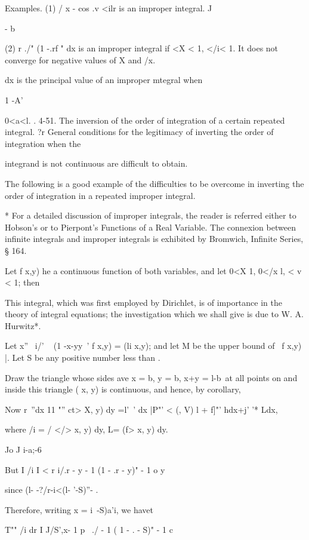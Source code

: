 Examples. (1) / x - cos .v <ilr is an improper integral. J

- b

(2) r ./" (1 -.rf " dx is an improper integral if <X < 1, </i< 1. It
does not converge for negative values of X and /x.

dx is the principal value of an improper mtegral when

1 -A'

0<a<l. . 4-51. The inversion of the order of integration of a certain
repeated integral. ?r General conditions for the legitimacy of
inverting the order of integration when the

integrand is not continuous are difficult to obtain.

The following is a good example of the difficulties to be overcome in
inverting the order of integration in a repeated improper integral.

* For a detailed discussion of improper integrals, the reader is
referred either to Hobson's or to Pierpont's Functions of a Real
Variable. The connexion between infinite integrals and improper
integrals is exhibited by Bromwich, Infinite Series, § 164.

%
%

Let f x,y) he a continuous function of both variables, and let 0<X 1,
0</x l, < v < 1; then

This integral, which was first employed by Dirichlet, is of
importance in the theory of integral equations; the investigation
which we shall give is due to W. A. Hurwitz*.

Let x''~ i/' ~ (1 -x-yy~' f x,y) = (li x,y); and let M be the upper
bound of \ f x,y) |. Let S be any positive number less than .

Draw the triangle whose sides ave x = b, y = b, x+y = l-b\ at all
points on and inside this triangle ( x, y) is continuous, and hence,
by  corollary,

Now r~''dx 11 "'' ct> X, y) dy =l'~' dx |P"' < (, V) l + f]"' hdx+j'
'* Ldx,

where /i = / </> x, y) dy, L= (f> x, y) dy.

Jo J i-a;-6

But I /i I < r i/.r - y - 1 (1 - .r - y)" - 1 o y

since (l- -?/r-i<(l- '-S)''- .

Therefore, writing x = i\ -S)a'i, we havet

T"" /i dr I J/S',x- 1 p~ ./ - 1 ( 1 - .  - S)" - 1 c

